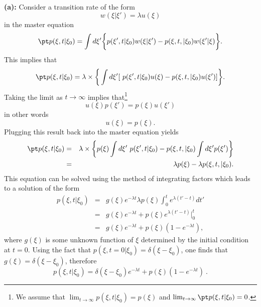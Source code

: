 \textbf{(a):} 
Consider a transition rate of the form 
\begin{equation}
w(\xi|\xi') = \lambda u(\xi) \label{eq:kubo_anderson_rate}
\end{equation} 
in the master equation
\begin{equation}
\pt p(\xi, t | \xi_0) = \int d\xi' \bigg\{ p(\xi', t | \xi_0) w(\xi|\xi') -  p(\xi, t, |\xi_0) w(\xi'|\xi) \bigg\}. \nonumber
\end{equation}
This implies that
\begin{equation}
\pt p(\xi, t | \xi_0) = \lambda \times \bigg\{ \int d \xi' [~p(\xi', t | \xi_0) u(\xi) - p(\xi, t, |\xi_0) u(\xi') ]\bigg\}. \label{eq:kubo_anderson_master}
\end{equation}
Taking the limit as $t\rightarrow\infty$ implies that\footnote{We assume that $\lim_{t\rightarrow\infty} p(\xi, t | \xi_0) = p(\xi)$ and $\lim_{t\rightarrow\infty} \pt p(\xi, t | \xi_0) = 0$.}
\begin{equation}
u(\xi) p(\xi') = p(\xi) u(\xi')
\end{equation}  
in other words 
\begin{equation}
u(\xi) = p(\xi).
\end{equation}
Plugging this result back into the master equation yields
\begin{eqnarray}
\pt p(\xi, t | \xi_0) &=& \lambda \times \bigg\{ p(\xi) \int d \xi' ~p(\xi', t | \xi_0) - p(\xi, t, |\xi_0) \int d \xi' p(\xi')  \bigg\} \\
&=&  \lambda p(\xi) - \lambda p(\xi, t, |\xi_0).
\end{eqnarray}
This equation can be solved using the method of integrating factors which leads to a solution of the form
\begin{eqnarray}
p(\xi, t | \xi_0) &=& g(\xi) e^{-\lambda t} \lambda p(\xi) \int_{0}^{t} e^{\lambda(t'-t)} dt'  \nonumber \\
&=& g(\xi) e^{-\lambda t} + p(\xi) e^{\lambda(t'-t)} \bigg|^{t}_{0} \nonumber \\
&=& g(\xi) e^{-\lambda t} + p(\xi) (1-e^{-\lambda t}),
\end{eqnarray}
where $g(\xi)$ is some unknown function of $\xi$ determined by the initial condition at $t=0$. Using the fact that $p(\xi,t=0|\xi_0) = \delta(\xi-\xi_0)$, one finds that $g(\xi) = \delta(\xi-\xi_0)$, therefore
\begin{equation}
\boxed{p(\xi, t | \xi_0)  = \delta(\xi-\xi_0) e^{-\lambda t} + p(\xi) (1-e^{-\lambda t})}~.
\end{equation}


